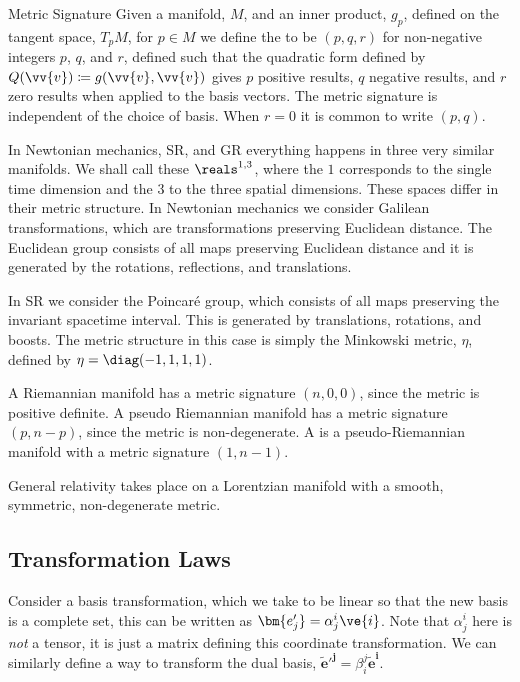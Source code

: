 \documentclass[fleqn]{NotesClass}
\newcommand*{\cve}[1]{\bm{\tilde{e}^{#1}}}
\newcommand*{\vep}[1]{\bm{e'_{#1}}}
\newcommand*{\cvep}[1]{\bm{\tilde{e}'^{#1}}}
\begin{document}
    \begin{dfn}{Metric Signature}{}
        Given a manifold, \(M\), and an inner product, \(g_p\), defined on the tangent space, \(T_pM\), for \(p \in M\) we define the  to be \((p, q, r)\) for non-negative integers \(p\), \(q\), and \(r\), defined such that the quadratic form defined by \(Q(\vv{v}) \coloneqq g(\vv{v}, \vv{v})\) gives \(p\) positive results, \(q\) negative results, and \(r\) zero results when applied to the basis vectors.
        The metric signature is independent of the choice of basis.
        When \(r = 0\) it is common to write \((p, q)\).
    \end{dfn}
    
    In Newtonian mechanics, SR, and GR everything happens in three very similar manifolds.
    We shall call these \(\reals^{1, 3}\), where the \(1\) corresponds to the single time dimension and the \(3\) to the three spatial dimensions.
    These spaces differ in their metric structure.
    In Newtonian mechanics we consider Galilean transformations, which are transformations preserving Euclidean distance.
    The Euclidean group consists of all maps preserving Euclidean distance and it is generated by the rotations, reflections, and translations.
    
    In SR we consider the Poincar\'e group, which consists of all maps preserving the invariant spacetime interval.
    This is generated by translations, rotations, and boosts.
    The metric structure in this case is simply the Minkowski metric, \(\eta\), defined by \(\eta = \diag(-1, 1, 1, 1)\).
    
    A Riemannian manifold has a metric signature \((n, 0, 0)\), since the metric is positive definite.
    A pseudo Riemannian manifold has a metric signature \((p, n - p)\), since the metric is non-degenerate.
    A  is a pseudo-Riemannian manifold with a metric signature \((1, n - 1)\).
    
    General relativity takes place on a Lorentzian manifold with a smooth, symmetric, non-degenerate metric.
    
    \subsection{Transformation Laws}
    Consider a basis transformation, which we take to be linear so that the new basis is a complete set, this can be written as \(\vep{j} = \alpha^i_j \ve{i}\).
    Note that \(\alpha^i_j\) here is \emph{not} a tensor, it is just a matrix defining this coordinate transformation.
    We can similarly define a way to transform the dual basis, \(\cvep{j} = \beta^j_i\cve{i}\).
    
\end{document}
